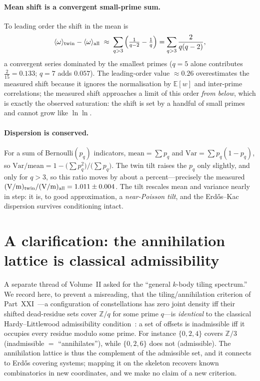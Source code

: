\documentclass[11pt,a4paper]{article}
\theoremstyle{remark}\newtheorem{remark}{Remark}
\begin{document}
\paragraph{Mean shift is a convergent small-prime sum.} To leading order the shift
in the mean is
\begin{equation}
  \langle\omega\rangle_{\rm twin}-\langle\omega\rangle_{\rm all}
  \;\approx\;\sum_{q>3}\Big(\tfrac{1}{q-2}-\tfrac1q\Big)
  =\sum_{q>3}\frac{2}{q(q-2)},
\end{equation}
a convergent series dominated by the smallest primes ($q=5$ alone contributes
$\tfrac{2}{15}=0.133$; $q=7$ adds $0.057$). The leading-order value $\approx0.26$
overestimates the measured shift because it ignores the normalisation by
$\mathbb{E}[w]$ and inter-prime correlations; the measured shift approaches a limit
of this order \emph{from below}, which is exactly the observed saturation: the shift
is set by a handful of small primes and cannot grow like $\ln\ln$.

\paragraph{Dispersion is conserved.} For a sum of Bernoulli$(p_q)$ indicators,
$\mathrm{mean}=\sum p_q$ and $\mathrm{Var}=\sum p_q(1-p_q)$, so
$\mathrm{Var}/\mathrm{mean}=1-\big(\sum p_q^2\big)/\big(\sum p_q\big)$. The twin tilt
raises the $p_q$ only slightly, and only for $q>3$, so this ratio moves by about a
percent---precisely the measured $(\mathrm{V/m})_{\rm twin}/(\mathrm{V/m})_{\rm
all}=1.011\pm0.004$. The tilt rescales mean and variance nearly in step: it is, to
good approximation, a \emph{near-Poisson tilt}, and the Erd\H{o}s--Kac dispersion
survives conditioning intact.

\section{A clarification: the annihilation lattice is classical admissibility}
A separate thread of Volume~II asked for the ``general $k$-body tiling spectrum.''
We record here, to prevent a misreading, that the tiling/annihilation criterion of
Part~XXI~\cite{ChenXXI}---a configuration of constellations has zero joint density
iff their shifted dead-residue sets cover $\mathbb{Z}/q$ for some prime $q$---is
\emph{identical} to the classical Hardy--Littlewood admissibility
condition~\cite{HL}: a set of offsets is inadmissible iff it occupies every residue
modulo some prime. For instance $\{0,2,4\}$ covers $\mathbb{Z}/3$ (inadmissible $=$
``annihilates''), while $\{0,2,6\}$ does not (admissible). The annihilation lattice
is thus the complement of the admissible set, and it connects to Erd\H{o}s covering
systems; mapping it on the skeleton recovers known combinatorics in new
coordinates, and we make no claim of a new criterion.
\end{document}

